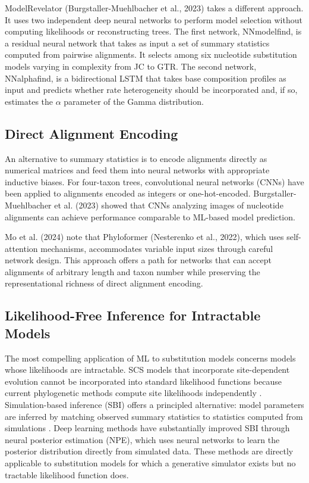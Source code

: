 ModelRevelator (Burgstaller-Muehlbacher et al., 2023) takes a different approach. It uses two independent deep neural networks to perform model selection without computing likelihoods or reconstructing trees. The first network, NNmodelfind, is a residual neural network that takes as input a set of summary statistics computed from pairwise alignments. It selects among six nucleotide substitution models varying in complexity from JC to GTR. The second network, NNalphafind, is a bidirectional LSTM that takes base composition profiles as input and predicts whether rate heterogeneity should be incorporated and, if so, estimates the $\alpha$ parameter of the Gamma distribution.

\subsection{Direct Alignment Encoding}

An alternative to summary statistics is to encode alignments directly as numerical matrices and feed them into neural networks with appropriate inductive biases. For four-taxon trees, convolutional neural networks (CNNs) have been applied to alignments encoded as integers or one-hot-encoded. Burgstaller-Muehlbacher et al. (2023) showed that CNNs analyzing images of nucleotide alignments can achieve performance comparable to ML-based model prediction.

Mo et al. (2024) note that Phyloformer (Nesterenko et al., 2022), which uses self-attention mechanisms, accommodates variable input sizes through careful network design. This approach offers a path for networks that can accept alignments of arbitrary length and taxon number while preserving the representational richness of direct alignment encoding.

\subsection{Likelihood-Free Inference for Intractable Models}

The most compelling application of ML to substitution models concerns models whose likelihoods are intractable. SCS models that incorporate site-dependent evolution cannot be incorporated into standard likelihood functions because current phylogenetic methods compute site likelihoods independently \parencite{yang2006}. Simulation-based inference (SBI) offers a principled alternative: model parameters are inferred by matching observed summary statistics to statistics computed from simulations \parencite{cranmer2020}. Deep learning methods have substantially improved SBI through neural posterior estimation (NPE), which uses neural networks to learn the posterior distribution directly from simulated data. These methods are directly applicable to substitution models for which a generative simulator exists but no tractable likelihood function does.

